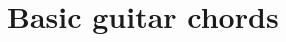\documentclass[oneside]{book}
\let\oldsection\section
\renewcommand{\section}{\newpage\oldsection}
\begin{document}
\hypertarget{TOC}{}
\tableofcontents

\section*{Basic guitar chords}
\hypertarget{Chords}{}


\end{document}
